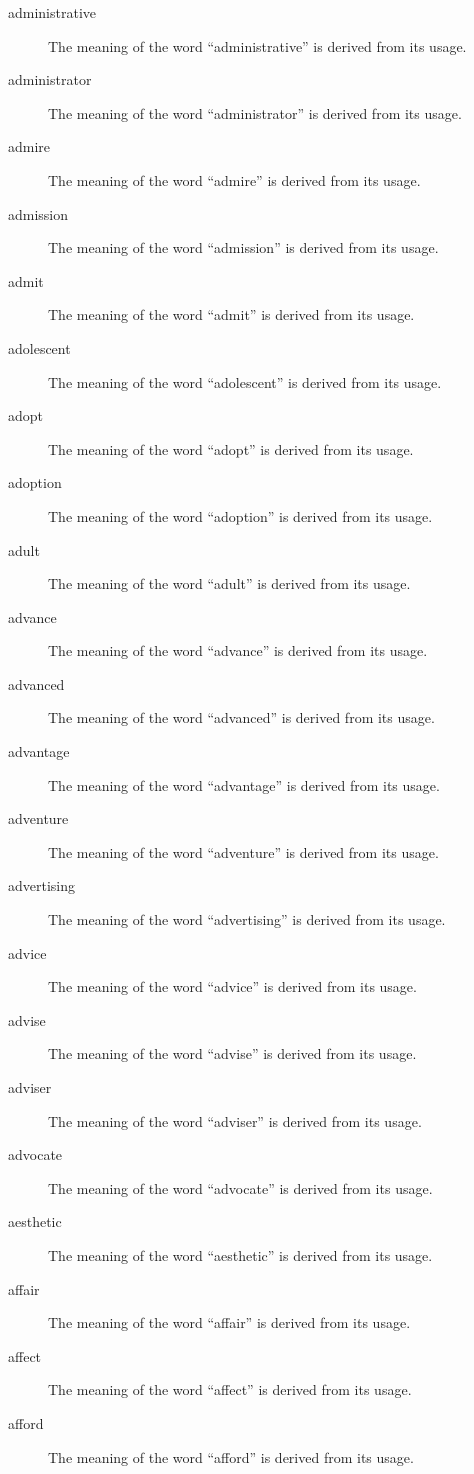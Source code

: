 \documentclass[12pt, letterpaper]{memoir}
\begin{document}
\begin{description}
\item[administrative] The meaning of the word ``administrative'' is derived from its usage.
\item[administrator] The meaning of the word ``administrator'' is derived from its usage.
\item[admire] The meaning of the word ``admire'' is derived from its usage.
\item[admission] The meaning of the word ``admission'' is derived from its usage.
\item[admit] The meaning of the word ``admit'' is derived from its usage.
\item[adolescent] The meaning of the word ``adolescent'' is derived from its usage.
\item[adopt] The meaning of the word ``adopt'' is derived from its usage.
\item[adoption] The meaning of the word ``adoption'' is derived from its usage.
\item[adult] The meaning of the word ``adult'' is derived from its usage.
\item[advance] The meaning of the word ``advance'' is derived from its usage.
\item[advanced] The meaning of the word ``advanced'' is derived from its usage.
\item[advantage] The meaning of the word ``advantage'' is derived from its usage.
\item[adventure] The meaning of the word ``adventure'' is derived from its usage.
\item[advertising] The meaning of the word ``advertising'' is derived from its usage.
\item[advice] The meaning of the word ``advice'' is derived from its usage.
\item[advise] The meaning of the word ``advise'' is derived from its usage.
\item[adviser] The meaning of the word ``adviser'' is derived from its usage.
\item[advocate] The meaning of the word ``advocate'' is derived from its usage.
\item[aesthetic] The meaning of the word ``aesthetic'' is derived from its usage.
\item[affair] The meaning of the word ``affair'' is derived from its usage.
\item[affect] The meaning of the word ``affect'' is derived from its usage.
\item[afford] The meaning of the word ``afford'' is derived from its usage.

\end{description}
\end{document}
